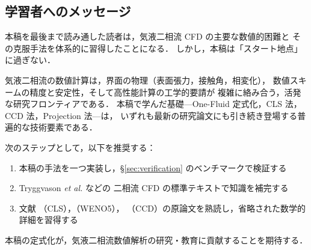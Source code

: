 \subsection{学習者へのメッセージ}
\label{sec:message}

本稿を最後まで読み通した読者は，気液二相流 CFD の主要な数値的困難と
その克服手法を体系的に習得したことになる．
しかし，本稿は「スタート地点」に過ぎない．

気液二相流の数値計算は，界面の物理（表面張力，接触角，相変化），
数値スキームの精度と安定性，そして高性能計算の工学的要請が
複雑に絡み合う，活発な研究フロンティアである．
本稿で学んだ基礎—One-Fluid 定式化，CLS 法，CCD 法，Projection 法—は，
いずれも最新の研究論文にも引き続き登場する普遍的な技術要素である．

次のステップとして，以下を推奨する：
\begin{enumerate}
  \item 本稿の手法を一つ実装し，§\ref{sec:verification} のベンチマークで検証する
  \item Tryggvason \textit{et al.} \cite{Tryggvason2011} などの
        二相流 CFD の標準テキストで知識を補完する
  \item 文献 \cite{OlssonKreiss2005}（CLS），\cite{JiangShu1996}（WENO5），
        \cite{ChuFan1998}（CCD）の原論文を熟読し，省略された数学的詳細を習得する
\end{enumerate}

本稿の定式化が，気液二相流数値解析の研究・教育に貢献することを期待する．
